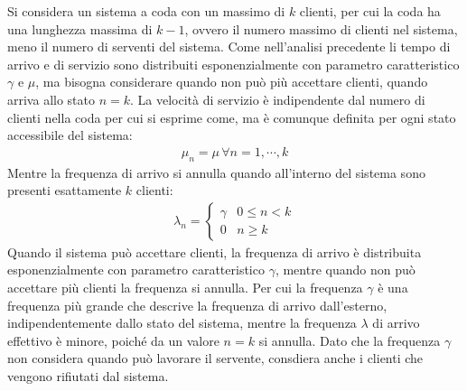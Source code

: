\documentclass{article}
\numberwithin{equation}{subsection}
\begin{document}
Si considera un sistema a coda con un massimo di $k$ clienti, per cui la coda ha una lunghezza massima di $k-1$, ovvero il numero massimo di clienti nel sistema, meno il numero 
di serventi del sistema. Come nell'analisi precedente li tempo di arrivo e di servizio sono distribuiti esponenzialmente con parametro caratteristico $\gamma$ e $\mu$, ma 
bisogna considerare quando non può più accettare clienti, quando arriva allo stato $n=k$. La velocità di servizio è indipendente dal numero di clienti nella coda per cui si 
esprime come, ma è comunque definita per ogni stato accessibile del sistema: 
\begin{gather*}
    \mu_n=\mu\,\forall n=1,\cdots,k
\end{gather*}
Mentre la frequenza di arrivo si annulla quando all'interno del sistema sono presenti esattamente $k$ clienti:
\begin{gather*}
    \lambda_n=\begin{cases}
        \gamma&0\leq n<k\\
        0 &n\geq k
    \end{cases}
\end{gather*}
Quando il sistema può accettare clienti, la frequenza di arrivo è distribuita esponenzialmente con parametro caratteristico $\gamma$, mentre quando non può accettare più 
clienti la frequenza si annulla. Per cui la frequenza $\gamma$ è una frequenza più grande che descrive la frequenza di arrivo dall'esterno, indipendentemente dallo stato 
del sistema, mentre la frequenza $\lambda$ di arrivo effettivo è minore, poiché da un valore $n=k$ si annulla. Dato che la frequenza $\gamma$ non considera quando può lavorare 
il servente, consdiera anche i clienti che vengono rifiutati dal sistema. 
\end{document}
